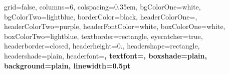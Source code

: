 \documentclass[landscape,a0paper,fontscale=0.265]{baposter}
\begin{document}
\begin{poster}%
  {
  grid=false,
  columns=6,
  colspacing=0.35em,
  bgColorOne=white,
  bgColorTwo=lightblue,
  borderColor=black,
  headerColorOne=\maincolor,
  headerColorTwo=purple,
  headerFontColor=white,
  boxColorOne=white,
  boxColorTwo=lightblue,
  textborder=rectangle,
  eyecatcher=true,
  headerborder=closed,
  headerheight=0.\textheight,
  headershape=rectangle,
  headershade=plain,
  headerfont=\Large\fontfamily{\sfdefault}\bfseries, %
  textfont={\setlength{\parindent}{1.5em}},
  boxshade=plain,
  background=plain,
  linewidth=0.5pt
  }
  {
  }
  {
  }
  {
  }
  {%
  }


\end{poster}
\end{document}
